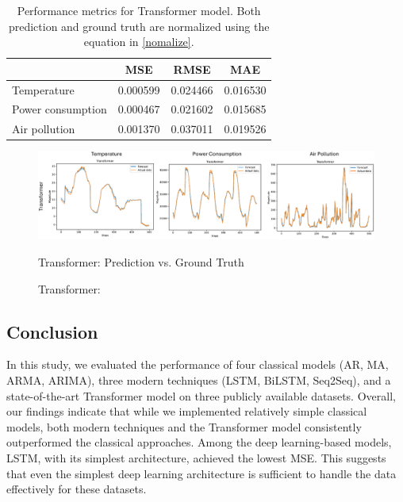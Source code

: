 \documentclass{scrartcl}
\begin{document}
\begin{table}[h!]
\centering
\begin{tabular}{@{}lccc@{}}
\toprule
\textbf{}               & \textbf{MSE} & \textbf{RMSE} & \textbf{MAE} \\ \midrule
Temperature             & 0.000599     & 0.024466      & 0.016530     \\
Power consumption       & 0.000467     & 0.021602      & 0.015685     \\
Air pollution           & 0.001370     & 0.037011      & 0.019526     \\ \bottomrule
\end{tabular}
\caption{Performance metrics for Transformer model. Both prediction and ground truth are normalized using the equation in \ref{nomalize}.}
\label{tab:trans_metric}
\end{table}


\begin{figure}[H]
	\begin{center}
		\includegraphics[scale=0.8]{Latex_report/fig/trans.pdf}
	\end{center}
	\caption{Transformer: Prediction vs. Ground Truth}
	\caption{Transformer: }
	\label{fig:trans}
\end{figure}




\subsection{Conclusion}
In this study, we evaluated the performance of four classical models (AR, MA, ARMA, ARIMA), three modern techniques (LSTM, BiLSTM, Seq2Seq), and a state-of-the-art Transformer model on three publicly available datasets. Overall, our findings indicate that while we implemented relatively simple classical models, both modern techniques and the Transformer model consistently outperformed the classical approaches. Among the deep learning-based models, LSTM, with its simplest architecture, achieved the lowest MSE. This suggests that even the simplest deep learning architecture is sufficient to handle the data effectively for these datasets.
\end{document}
